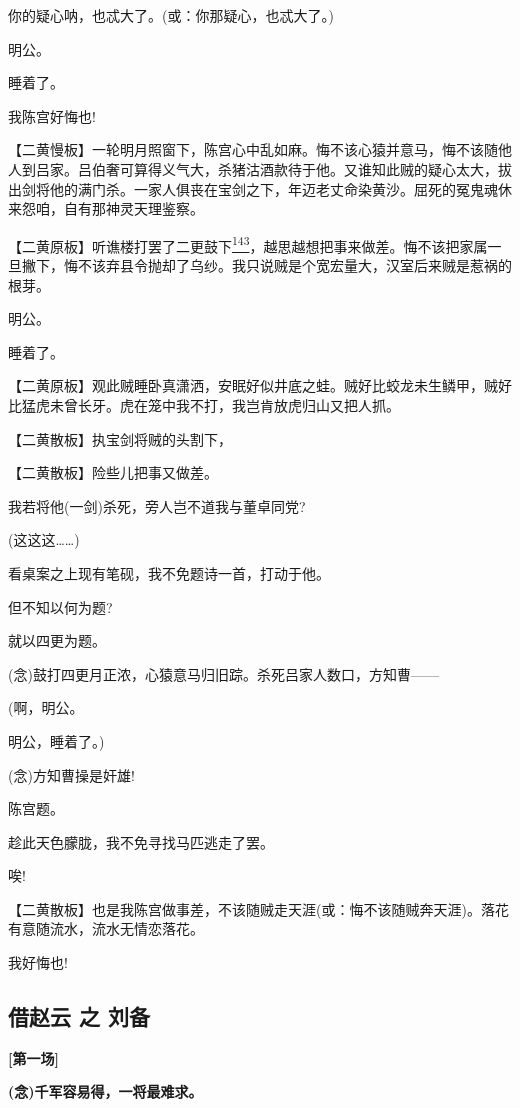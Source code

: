 你的疑心呐，也忒大了。(或：你那疑心，也忒大了。)

明公。

睡着了。

我陈宫好悔也!

【二黄慢板】一轮明月照窗下，陈宫心中乱如麻。悔不该心猿并意马，悔不该随他人到吕家。吕伯奢可算得义气大，杀猪沽酒款待于他。又谁知此贼的疑心太大，拔出剑将他的满门杀。一家人俱丧在宝剑之下，年迈老丈命染黄沙。屈死的冤鬼魂休来怨咱，自有那神灵天理鉴察。

【二黄原板】听谯楼打罢了二更鼓下\protect\hyperlink{fn143}{\textsuperscript{143}}，越思越想把事来做差。悔不该把家属一旦撇下，悔不该弃县令抛却了乌纱。我只说贼是个宽宏量大，汉室后来贼是惹祸的根芽。

明公。

睡着了。

【二黄原板】观此贼睡卧真潇洒，安眠好似井底之蛙。贼好比蛟龙未生鳞甲，贼好比猛虎未曾长牙。虎在笼中我不打，我岂肯放虎归山又把人抓。

【二黄散板】执宝剑将贼的头割下，

【二黄散板】险些儿把事又做差。

我若将他(一剑)杀死，旁人岂不道我与董卓同党?

(这这这\ldots{}\ldots{})

看桌案之上现有笔砚，我不免题诗一首，打动于他。

但不知以何为题?

就以四更为题。

(念)鼓打四更月正浓，心猿意马归旧踪。杀死吕家人数口，方知曹------

(啊，明公。

明公，睡着了。)

(念)方知曹操是奸雄!

陈宫题。

趁此天色朦胧，我不免寻找马匹逃走了罢。

唉!

【二黄散板】也是我陈宫做事差，不该随贼走天涯(或：悔不该随贼奔天涯)。落花有意随流水，流水无情恋落花。

我好悔也!

\newpage
\hypertarget{ux501fux8d75ux4e91-ux4e4b-ux5218ux5907}{%
\subsection{借赵云 之
刘备}\label{ux501fux8d75ux4e91-ux4e4b-ux5218ux5907}}

\textbf{{[}第一场{]}}

\textbf{(念)千军容易得，一将最难求。}

